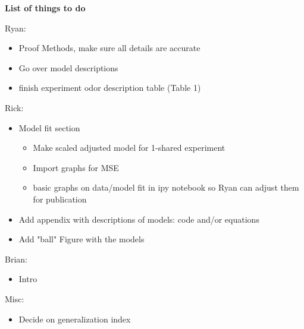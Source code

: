 \textbf{List of things to do}

Ryan:
\begin{itemize}
\item Proof Methods, make sure all details are accurate
\item Go over model descriptions
\item finish experiment odor description table (Table 1)
\end{itemize}
Rick:
\begin{itemize}
\item Model fit section
\begin{itemize}
\finish 
\item Make scaled adjusted model for 1-shared experiment
\item Import graphs for MSE
\item basic graphs on data/model fit in ipy notebook so Ryan can adjust them for publication
\end{itemize}

\item Add appendix with descriptions of models: code and/or equations
\item Add "ball" Figure with the models
\end{itemize}

Brian:
\begin{itemize}
\item Intro
\end{itemize}

Misc:
\begin{itemize}
\item Decide on generalization index
\end{itemize}
